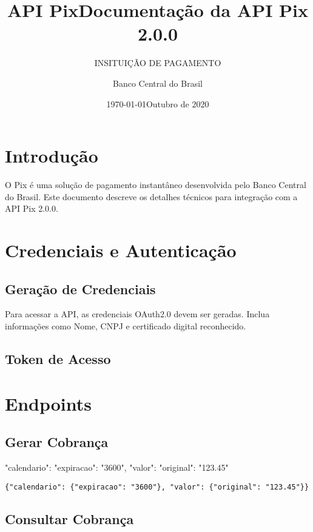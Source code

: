 \documentclass{apiDoc}
\title{API Pix}
\author{INSITUIÇÃO DE PAGAMENTO}
\date{\today}
\begin{document}
\makecover

\title{Documentação da API Pix 2.0.0}
\author{Banco Central do Brasil}
\date{Outubro de 2020}
\maketitle

\tableofcontents

\section{Introdução}
O Pix é uma solução de pagamento instantâneo desenvolvida pelo Banco Central do Brasil. Este documento descreve os detalhes técnicos para integração com a API Pix 2.0.0.

\section{Credenciais e Autenticação}
\subsection{Geração de Credenciais}
Para acessar a API, as credenciais OAuth2.0 devem ser geradas. Inclua informações como Nome, CNPJ e certificado digital reconhecido.

\subsection{Token de Acesso}

\section{Endpoints}
\subsection{Gerar Cobrança}
 {"calendario": {"expiracao": "3600"}, "valor": {"original": "123.45"}}

\begin{lstlisting}
{"calendario": {"expiracao": "3600"}, "valor": {"original": "123.45"}}
\end{lstlisting}


\subsection{Consultar Cobrança}
\end{document}
